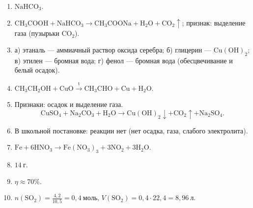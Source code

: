 \documentclass[a4paper,12pt]{article}
\begin{document}
\begin{enumerate}
    \item \(\mathrm{NaHCO_3}\).

    \item \(\mathrm{CH_3COOH + NaHCO_3 \rightarrow CH_3COONa + H_2O + CO_2\uparrow}\);
    признак: выделение газа (пузырьки \(\mathrm{CO_2}\)).

    \item а) этаналь --- аммиачный раствор оксида серебра;
    б) глицерин --- \(\mathrm{Cu(OH)_2}\);
    в) этилен --- бромная вода;
    г) фенол --- бромная вода (обесцвечивание и белый осадок).

    \item \(\mathrm{CH_3CH_2OH + CuO \xrightarrow{t} CH_3CHO + Cu + H_2O}\).

    \item Признаки: осадок и выделение газа.
    \[
    \mathrm{CuSO_4 + Na_2CO_3 + H_2O \rightarrow Cu(OH)_2\downarrow + CO_2\uparrow + Na_2SO_4}.
    \]

    \item В школьной постановке: реакции нет (нет осадка, газа, слабого электролита).

    \item \(\mathrm{Fe + 6HNO_3 \rightarrow Fe(NO_3)_3 + 3NO_2 + 3H_2O}\).

    \item \(14\ \mathrm{г}\).

    \item \(\eta \approx 70\%\).

    \item \(n(\mathrm{SO_2})=\frac{4{,}2}{10{,}5}=0{,}4\ \mathrm{моль}\),
    \(V(\mathrm{SO_2})=0{,}4\cdot 22{,}4=8{,}96\ \mathrm{л}\).
\end{enumerate}
\end{document}
